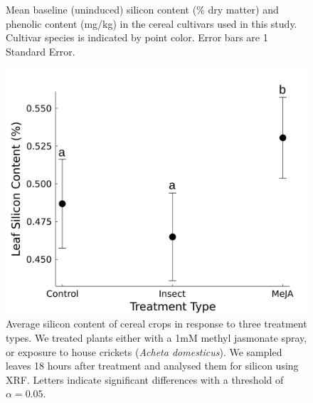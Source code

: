 \documentclass[12pt, letterpaper]{report}
\begin{document}
\begin{figure}[ht]
        \centering
        \caption{Mean baseline (uninduced) silicon content (\% dry matter) and phenolic content (mg/kg) in the cereal cultivars used in this study. Cultivar species is indicated by point color. Error bars are 1 Standard Error.}
        \label{Fig:baseline_si}
\end{figure}

\begin{figure}[ht]
        \includegraphics[width = \textwidth]{images/induction_only_bytrt_annotated.png}
        \centering
        \caption{Average silicon content of cereal crops in response to three treatment types. We treated plants either with a 1mM methyl jasmonate spray, or exposure to house crickets (\textit{Acheta domesticus}). We sampled leaves 18 hours after treatment and analysed them for silicon using XRF. Letters indicate significant differences with a threshold of $\alpha = 0.05$.}
        \label{Fig:induction_across_spp}
\end{figure}
\end{document}
